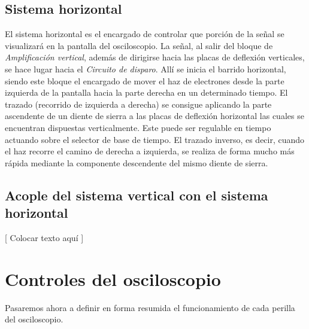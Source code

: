 \documentclass{article}
\begin{document}
\subsection{Sistema horizontal}
	
	El sistema horizontal es el encargado de controlar que porción de la señal se visualizará en la pantalla del osciloscopio. La señal, al salir del bloque de \textit{Amplificación vertical}, además de dirigirse hacia las placas de deflexión verticales, se hace lugar hacia el \textit{Circuito de disparo}. Allí se inicia el barrido horizontal, siendo este bloque el encargado de mover el haz de electrones desde la parte izquierda de la pantalla hacia la parte derecha en un determinado tiempo. El trazado (recorrido de izquierda a derecha) se consigue aplicando la parte ascendente de un diente de sierra a las placas de deflexión horizontal las cuales se encuentran dispuestas verticalmente. Este puede ser regulable en tiempo actuando sobre el selector de base de tiempo. El trazado inverso, es decir, cuando el haz recorre el camino de derecha a izquierda, se realiza de forma mucho más rápida mediante la componente descendente del mismo diente de sierra.
	\bigskip\bigskip



\subsection{Acople del sistema vertical con el sistema horizontal}

	[ Colocar texto aquí ]
	\bigskip\bigskip




\section{Controles del osciloscopio}

	Pasaremos ahora a definir en forma resumida el funcionamiento de cada perilla del osciloscopio. 
\bigskip
\end{document}
